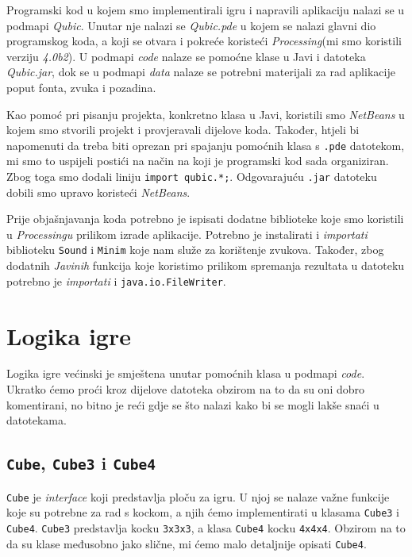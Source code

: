 \documentclass[12pt]{scrartcl}
\begin{document}
Programski kod u kojem smo implementirali igru i napravili aplikaciju nalazi se u podmapi \emph{Qubic}. Unutar nje nalazi se \emph{Qubic.pde} u kojem se nalazi glavni dio programskog koda, a koji se otvara i pokreće koristeći \emph{Processing}(mi smo koristili verziju \emph{4.0b2}). U podmapi \emph{code} nalaze se pomoćne klase u Javi i datoteka \emph{Qubic.jar}, dok se u podmapi \emph{data} nalaze se potrebni materijali za rad aplikacije poput fonta, zvuka i pozadina. 

Kao pomoć pri pisanju projekta, konkretno klasa u Javi, koristili smo \emph{NetBeans} u kojem smo stvorili projekt i provjeravali dijelove koda. Također, htjeli bi napomenuti da treba biti oprezan pri spajanju pomoćnih klasa s \texttt{.pde} datotekom, mi smo to uspijeli postići na način na koji je programski kod sada organiziran. Zbog toga smo dodali liniju \texttt{import qubic.*;}. Odgovarajuću \texttt{.jar} datoteku dobili smo upravo koristeći \emph{NetBeans}.

Prije objašnjavanja koda potrebno je ispisati dodatne biblioteke koje smo koristili u \emph{Processingu} prilikom izrade aplikacije. Potrebno je instalirati i \emph{importati} biblioteku \texttt{Sound} i \texttt{Minim} koje nam služe za korištenje zvukova. Također, zbog dodatnih \emph{Javinih} funkcija koje koristimo prilikom spremanja rezultata u datoteku potrebno je \emph{importati} i \texttt{java.io.FileWriter}.


\section{Logika igre}
Logika igre većinski je smještena unutar pomoćnih klasa u podmapi \emph{code}. 
Ukratko ćemo proći kroz dijelove datoteka obzirom na to da su oni dobro komentirani, no bitno je reći gdje se što nalazi kako bi se mogli lakše snaći u datotekama.

\subsection{\texttt{Cube}, \texttt{Cube3} i \texttt{Cube4}}
\texttt{Cube} je \textit{interface} koji predstavlja ploču za igru. U njoj se nalaze važne funkcije koje su potrebne za rad s kockom, a njih ćemo implementirati u klasama \texttt{Cube3} i \texttt{Cube4}. \texttt{Cube3} predstavlja kocku \texttt{3x3x3}, a klasa \texttt{Cube4} kocku \texttt{4x4x4}. Obzirom na to da su klase međusobno jako slične, mi ćemo malo detaljnije opisati \texttt{Cube4}. 
\end{document}
